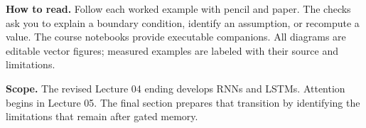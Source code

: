 \documentclass[11pt,a4paper]{article}
\begin{document}
\textbf{How to read.} Follow each worked example with pencil and paper.
The checks ask you to explain a boundary condition, identify an assumption,
or recompute a value. The course notebooks provide executable companions.
All diagrams are editable vector figures; measured examples are labeled with
their source and limitations.

\textbf{Scope.} The revised Lecture 04 ending develops RNNs and LSTMs.
Attention begins in Lecture 05. The final section prepares that transition
by identifying the limitations that remain after gated memory.










\setcounter{secnumdepth}{0}

\end{document}
